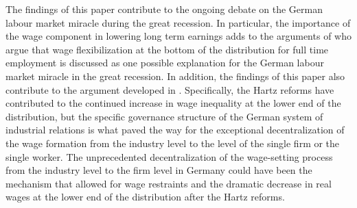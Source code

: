 \documentclass[12pt, a4paper]{article}
\begin{document}
The findings of this paper contribute to the ongoing debate on the German labour market miracle during the great recession. In particular, the importance of the wage component in lowering long term earnings adds to the arguments of \cite{BurdaHunt11} who argue that wage flexibilization at the bottom of the distribution for full time employment is discussed as one possible explanation for the German labour market miracle in the great recession. In addition, the findings of this paper also contribute to the argument developed in \cite{DuSpOe14}. Specifically, the Hartz reforms have contributed to the continued increase in wage inequality at the lower end of the distribution, but the specific governance structure of the German system of industrial relations is what paved the way for the exceptional decentralization of the wage formation from the industry level to the level of the single firm or the single worker. The unprecedented decentralization of the wage-setting process from the industry level to the firm level in Germany could have been the mechanism that allowed for wage restraints and the dramatic decrease in real wages at the lower end of the distribution after the Hartz reforms.


\end{document}
